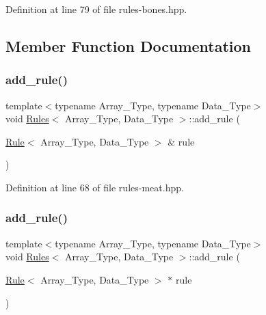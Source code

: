 Definition at line 79 of file rules-\/bones.\+hpp.



\subsection{Member Function Documentation}
\mbox{\label{class_rules_a60583152fddcb11178dcf3d02a924d7c}} 
\subsubsection{\texorpdfstring{add\+\_\+rule()}{add\_rule()}\hspace{0.1cm}{\footnotesize\ttfamily [1/3]}}
{\footnotesize\ttfamily template$<$typename Array\+\_\+\+Type, typename Data\+\_\+\+Type$>$ \\
void \hyperlink{class_rules}{Rules}$<$ Array\+\_\+\+Type, Data\+\_\+\+Type $>$\+::add\+\_\+rule (\begin{DoxyParamCaption}\item[{\hyperlink{class_rule}{Rule}$<$ Array\+\_\+\+Type, Data\+\_\+\+Type $>$ \&}]{rule }\end{DoxyParamCaption})\hspace{0.3cm}{\ttfamily [inline]}}



Definition at line 68 of file rules-\/meat.\+hpp.

\mbox{\label{class_rules_abd60b1d381ad0c8a772e4d81264bbe0a}} 
\subsubsection{\texorpdfstring{add\+\_\+rule()}{add\_rule()}\hspace{0.1cm}{\footnotesize\ttfamily [2/3]}}
{\footnotesize\ttfamily template$<$typename Array\+\_\+\+Type, typename Data\+\_\+\+Type$>$ \\
void \hyperlink{class_rules}{Rules}$<$ Array\+\_\+\+Type, Data\+\_\+\+Type $>$\+::add\+\_\+rule (\begin{DoxyParamCaption}\item[{\hyperlink{class_rule}{Rule}$<$ Array\+\_\+\+Type, Data\+\_\+\+Type $>$ $\ast$}]{rule }\end{DoxyParamCaption})\hspace{0.3cm}{\ttfamily [inline]}}



